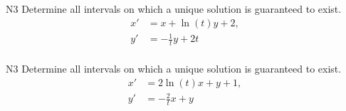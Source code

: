 \begin{problem}{N3}
Determine all intervals on which a unique solution is guaranteed to exist.
\begin{align*}
x' & = x + \ln(t)y + 2,\\
y'& = -\frac{1}{t}y + 2t\\
\end{align*}
\end{problem}

\begin{problem}{N3}
Determine all intervals on which a unique solution is guaranteed to exist.
\begin{align*}
x' & = 2\ln(t)x + y + 1,\\
y' & = -\frac{2}{t}x + y\\
\end{align*}
\end{problem}

